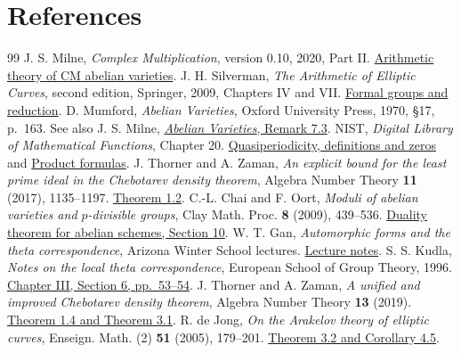 \documentclass[a4paper,11pt]{article}
\theoremstyle{definition}
\theoremstyle{remark}
\numberwithin{equation}{section}
\begin{document}
\section{References}\label{nav:bibliography-XIII}
\begingroup{}\begin{thebibliography}{99}\small
{} J. S. Milne, \emph{Complex Multiplication}, version 0.10, 2020, Part II. \href{https://www.jmilne.org/math/CourseNotes/CM.pdf}{Arithmetic theory of CM abelian varieties}.
 J. H. Silverman, \emph{The Arithmetic of Elliptic Curves}, second edition, Springer, 2009, Chapters IV and VII. \href{https://link.springer.com/book/10.1007/978-0-387-09494-6}{Formal groups and reduction}.
 D. Mumford, \emph{Abelian Varieties}, Oxford University Press, 1970, \S17, p.~163. See also J. S. Milne, \href{https://jmilne.org/math/xnotes/AVs.pdf}{\emph{Abelian Varieties}, Remark 7.3}.
 NIST, \emph{Digital Library of Mathematical Functions}, Chapter 20. \href{https://dlmf.nist.gov/20.2}{Quasiperiodicity, definitions and zeros} and \href{https://dlmf.nist.gov/20.5}{Product formulas}.
 J. Thorner and A. Zaman, \emph{An explicit bound for the least prime ideal in the Chebotarev density theorem}, Algebra Number Theory \textbf{11} (2017), 1135--1197. \href{https://arxiv.org/abs/1604.01750}{Theorem 1.2}.
 C.-L. Chai and F. Oort, \emph{Moduli of abelian varieties and \(p\)-divisible groups}, Clay Math. Proc. \textbf{8} (2009), 439--536. \href{https://www2.math.upenn.edu/~chai/papers_pdf/CMIPchaioort.pdf}{Duality theorem for abelian schemes, Section 10}.
 W. T. Gan, \emph{Automorphic forms and the theta correspondence}, Arizona Winter School lectures. \href{https://arxiv.org/abs/2303.14918}{Lecture notes}.
 S. S. Kudla, \emph{Notes on the local theta correspondence}, European School of Group Theory, 1996. \href{https://www.math.toronto.edu/skudla/castle.pdf}{Chapter III, Section 6, pp.~53--54}.
 J. Thorner and A. Zaman, \emph{A unified and improved Chebotarev density theorem}, Algebra Number Theory \textbf{13} (2019). \href{https://msp.org/ant/2019/13-5/ant-v13-n5-p02-p.pdf}{Theorem 1.4 and Theorem 3.1}.
 R. de Jong, \emph{On the Arakelov theory of elliptic curves}, Enseign. Math. (2) \textbf{51} (2005), 179--201. \href{https://arxiv.org/pdf/math/0312359}{Theorem 3.2 and Corollary 4.5}.
\end{thebibliography}\endgroup
\end{document}
